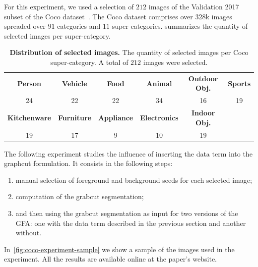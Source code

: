 \documentclass[review]{siamart220329}
\begin{document}
For this experiment, we used a selection of $212$ images of the Validation 2017 subset of the Coco dataset~\cite{lin2014microsoft}. The Coco dataset comprises over $328$k images spreaded over $91$ categories and $11$ super-categories.  summarizes the quantity of selected images per super-category. 
%
%
\begin{table}
\footnotesize
	\caption{\textbf{Distribution of selected images.} The quantity of selected images per Coco super-category. A total of $212$ images were selected.}\label{tab:image-categories-distribution}
\begin{tabular}{cccccc}
\textbf{Person} & \textbf{Vehicle} & \textbf{Food} & \textbf{Animal} & \textbf{Outdoor Obj.} & \textbf{Sports} \\
24 & 22 & 22 & 34 & 16 & 19 \\[1em]
\textbf{Kitchenware} & \textbf{Furniture} & \textbf{Appliance} & \textbf{Electronics} & \textbf{Indoor Obj.} & \\
19 & 17 & 9 & 10 & 19 &
\end{tabular}
\end{table}
%
%
The following experiment studies the influence of inserting the data term into the graphcut formulation. It consists in the following steps:
\begin{enumerate}
\item manual selection of foreground and background seeds for each selected image;
\item computation of the grabcut segmentation;
\item and then using the grabcut segmentation as input for two versions of the GFA: one with the data term described in the previous section and another without.
\end{enumerate}

In~\cref{fig:coco-experiment-sample} we show a sample of the images
used in the experiment. All the results are available online at the paper's
website.
\end{document}
